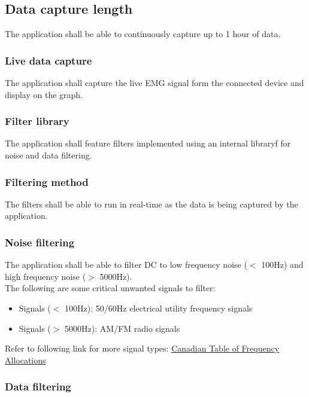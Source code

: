 \documentclass[12pt,a4paper]{article}
\begin{document}
\subsection{Data capture length}

The application shall be able to continuously capture up to 1 hour of data.

\subsubsection{Live data capture}

The application shall capture the live EMG signal form the connected device and display on the graph.

\subsubsection{Filter library}

The application shall feature filters implemented using an internal libraryf for noise and data filtering.

\subsubsection{Filtering method}

The filters shall be able to run in real-time as the data is being captured by the application.

\subsubsection{Noise filtering}

The application shall be able to filter DC to low frequency noise ($<$ 100Hz) and high frequency noise ($>$ 5000Hz). \\

The following are some critical unwanted signals to filter: 

\begin{itemize}
	\item Signals ($<$ 100Hz): 50/60Hz electrical utility frequency signals
	\item Signals ($>$ 5000Hz): AM/FM radio signals
\end{itemize}

Refer to following link for more signal types: \href{https://www.ic.gc.ca/eic/site/smt-gst.nsf/eng/sf10759.html#t2}{Canadian Table of Frequency Allocations}

\subsubsection{Data filtering}
\end{document}
